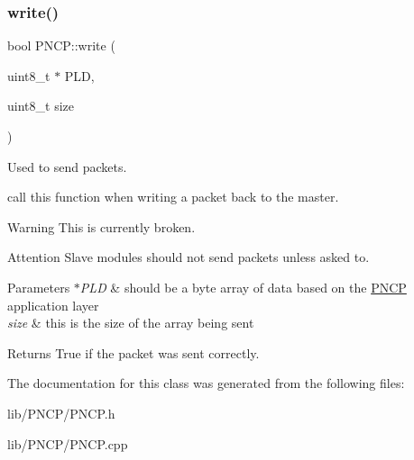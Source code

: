 \subsubsection{\texorpdfstring{write()}{write()}}
{\footnotesize\ttfamily bool P\+N\+C\+P\+::write (\begin{DoxyParamCaption}\item[{uint8\+\_\+t $\ast$}]{P\+LD,  }\item[{uint8\+\_\+t}]{size }\end{DoxyParamCaption})}



Used to send packets. 

call this function when writing a packet back to the master. \begin{DoxyWarning}{Warning}
This is currently broken.
\end{DoxyWarning}
\begin{DoxyAttention}{Attention}
Slave modules should not send packets unless asked to. 
\end{DoxyAttention}

\begin{DoxyParams}{Parameters}
{\em $\ast$\+P\+LD} & should be a byte array of data based on the \hyperlink{class_p_n_c_p}{P\+N\+CP} application layer \\
\hline
{\em size} & this is the size of the array being sent \\
\hline
\end{DoxyParams}
\begin{DoxyReturn}{Returns}
True if the packet was sent correctly. 
\end{DoxyReturn}


The documentation for this class was generated from the following files\+:\begin{DoxyCompactItemize}
\item 
lib/\+P\+N\+C\+P/P\+N\+C\+P.\+h\item 
lib/\+P\+N\+C\+P/P\+N\+C\+P.\+cpp\end{DoxyCompactItemize}

